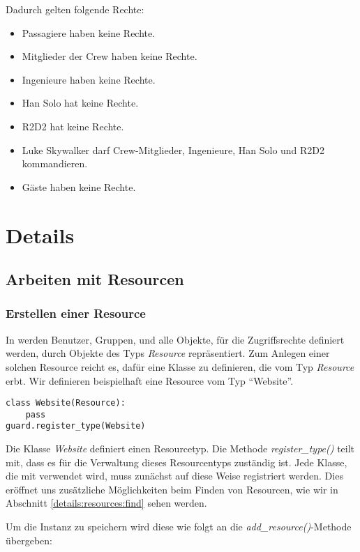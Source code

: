 Dadurch gelten folgende Rechte:

\begin{itemize}
\item Passagiere haben keine Rechte.
\item Mitglieder der Crew haben keine Rechte.
\item Ingenieure haben keine Rechte.
\item Han Solo hat keine Rechte.
\item R2D2 hat keine Rechte.
\item Luke Skywalker darf Crew-Mitglieder, Ingenieure, Han Solo und R2D2 
kommandieren.
\item Gäste haben keine Rechte.
\end{itemize}


\newpage
\section{Details}

\subsection{Arbeiten mit Resourcen}
\subsubsection{\label{details:resources:add}Erstellen einer Resource}

In \product werden Benutzer, Gruppen, und alle Objekte, für die 
Zugriffsrechte definiert werden, durch Objekte des Typs {\it Resource} 
repräsentiert.
Zum Anlegen einer solchen Resource reicht es, dafür eine Klasse zu 
definieren, die vom Typ {\it Resource} erbt. Wir definieren beispielhaft 
eine Resource vom Typ ``Website''.

\begin{lstlisting}
class Website(Resource):
    pass
guard.register_type(Website)
\end{lstlisting}

Die Klasse {\it Website} definiert einen Resourcetyp. Die Methode 
{\it register\_type()} teilt \product mit, dass es für die 
Verwaltung dieses Resourcentyps zuständig ist. Jede Klasse, die mit 
\product verwendet wird, muss zunächst auf diese Weise registriert werden. 
Dies eröffnet uns zusätzliche Möglichkeiten beim Finden von Resourcen, 
wie wir in Abschnitt \ref{details:resources:find} sehen werden.

Um die Instanz zu speichern wird diese wie folgt an die 
{\it add\_resource()}-Methode übergeben:

